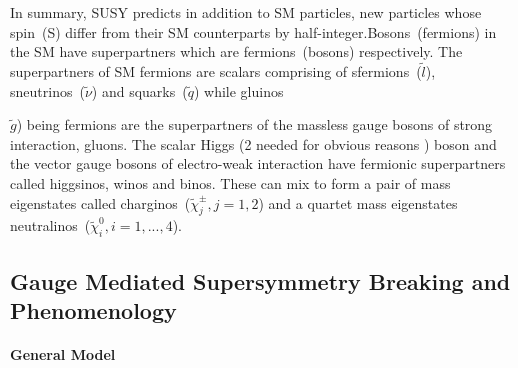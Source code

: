 In summary, SUSY predicts in addition to SM particles, new particles whose spin~(S) differ from their SM counterparts by half-integer.Bosons~(fermions) in the SM have superpartners which are fermions~(bosons) respectively.
The superpartners of SM fermions are scalars comprising of sfermions~($\tilde{l}$), sneutrinos~($\tilde{\nu}$) and squarks~($\tilde{q}$) while gluinos~{$\tilde{g}$) being fermions are the superpartners of the massless gauge bosons of strong interaction, gluons. The scalar Higgs (2 needed for obvious reasons ) boson and the vector gauge bosons of electro-weak interaction have fermionic superpartners called higgsinos, winos and binos. These can mix to form a pair of mass eigenstates called charginos~($\tilde{\chi}^{\pm}_{j}, j=1,2$) and a  quartet mass  eigenstates neutralinos~($\tilde{\chi}^{0}_{i}, i=1,...,4$).
\subsection{Gauge Mediated Supersymmetry Breaking and Phenomenology}
\paragraph{General Model}
}
